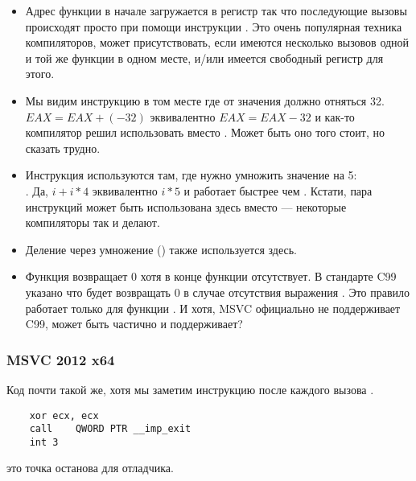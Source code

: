 \begin{itemize}
\item Адрес функции \printf в начале загружается в регистр 
\ESI так что последующие вызовы
\printf происходят просто при помощи инструкции .
Это очень популярная техника компиляторов, может присутствовать, если имеются несколько вызовов
одной и той же функции в одном месте, и/или имеется свободный регистр для этого.

\item Мы видим инструкцию  в том месте где от значения должно отняться 32.
$EAX=EAX+(-32)$ эквивалентно $EAX=EAX-32$ и как-то компилятор решил использовать  вместо .
Может быть оно того стоит, но сказать трудно.

\item Инструкция \LEA используются там, где нужно умножить значение на 5: \\
	.
Да, $i+i*4$ эквивалентно $i*5$ и \LEA работает быстрее чем .
Кстати, пара инструкций  может быть использована здесь
вместо \LEA --- некоторые компиляторы так и делают.

\item Деление через умножение () также используется здесь.

\item Функция \main возвращает 0 хотя  
в конце функции отсутствует.
В стандарте C99  указано что \main 
будет возвращать 0 в случае отсутствия выражения 
.
Это правило работает только для функции \main.
И хотя, MSVC официально не поддерживает C99, может быть частично и поддерживает?

\end{itemize}

\subsubsection{\Optimizing MSVC 2012 x64}

Код почти такой же, хотя мы заметим инструкцию  после каждого вызова .

\begin{lstlisting}
	xor	ecx, ecx
	call	QWORD PTR __imp_exit
	int	3
\end{lstlisting}

 это точка останова для отладчика.

